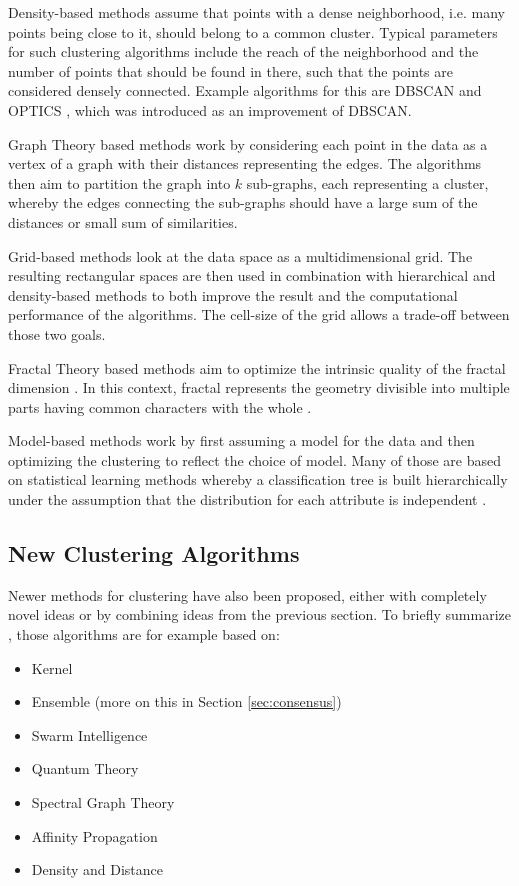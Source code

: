 \documentclass[
	a4paper,
	english,
	twoside,
	openright,               
	11pt                            
	]{report}
\begin{document}
Density-based methods assume that points with a dense neighborhood, i.e. many points being close to it, should belong to a common cluster. Typical parameters for such clustering algorithms include the reach of the neighborhood and the number of points that should be found in there, such that the points are considered densely connected. Example algorithms for this are DBSCAN \cite{10.5555/3001460.3001507} and OPTICS \cite{10.1145/304181.304187}, which was introduced as an improvement of DBSCAN.

Graph Theory based methods work by considering each point in the data as a vertex of a graph with their distances representing the edges. The algorithms then aim to partition the graph into $k$ sub-graphs, each representing a cluster, whereby the edges connecting the sub-graphs should have a large sum of the distances or small sum of similarities.

Grid-based methods look at the data space as a multidimensional grid. The resulting rectangular spaces are then used in combination with hierarchical and density-based methods to both improve the result and the computational performance of the algorithms. The cell-size of the grid allows a trade-off between those two goals.

Fractal Theory based methods aim to optimize the intrinsic quality of the fractal dimension \cite{surveyclustering}. In this context, fractal represents the geometry divisible into multiple parts having common characters with the whole \cite{surveyclustering}.

Model-based methods work by first assuming a model for the data and then optimizing the clustering to reflect the choice of model. Many of those are based on statistical learning methods whereby a classification tree is built hierarchically under the assumption that the distribution for each attribute is independent \cite{surveyclustering}.

\subsection{New Clustering Algorithms}

Newer methods for clustering have also been proposed, either with completely novel ideas or by combining ideas from the previous section. To briefly summarize \cite{surveyclustering}, those algorithms are for example based on:

\begin{itemize}
  \item Kernel
  \item Ensemble (more on this in Section \ref{sec:consensus})
  \item Swarm Intelligence
  \item Quantum Theory
  \item Spectral Graph Theory
  \item Affinity Propagation
  \item Density and Distance
\end{itemize}
\end{document}
